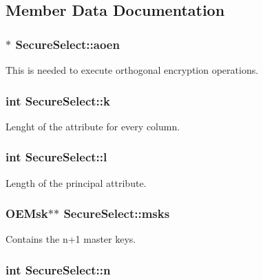 \subsection{Member Data Documentation}
\hypertarget{classSecureSelect_ace499f63f2609b19c429bee5638db42d}{
\subsubsection[{aoen}]{$\ast$ Secure\-Select\-::aoen}}\label{classSecureSelect_ace499f63f2609b19c429bee5638db42d}
This is needed to execute orthogonal encryption operations. \hypertarget{classSecureSelect_aa9172d68f4a5f9aef784703878e2c352}{
\subsubsection[{k}]{\setlength{\rightskip}{0pt plus 5cm}int Secure\-Select\-::k}}\label{classSecureSelect_aa9172d68f4a5f9aef784703878e2c352}
Lenght of the attribute for every column. \hypertarget{classSecureSelect_a010ed62263ff19f8b07dfaa298962f24}{
\subsubsection[{l}]{\setlength{\rightskip}{0pt plus 5cm}int Secure\-Select\-::l}}\label{classSecureSelect_a010ed62263ff19f8b07dfaa298962f24}
Length of the principal attribute. \hypertarget{classSecureSelect_a8f1233a931a2dce84a7f9588721d8301}{
\subsubsection[{msks}]{\setlength{\rightskip}{0pt plus 5cm}O\-E\-Msk$\ast$$\ast$ Secure\-Select\-::msks}}\label{classSecureSelect_a8f1233a931a2dce84a7f9588721d8301}
Contains the n+1 master keys. \hypertarget{classSecureSelect_a0834ef0de36dad948cec8d54fc89aada}{
\subsubsection[{n}]{\setlength{\rightskip}{0pt plus 5cm}int Secure\-Select\-::n}}\label{classSecureSelect_a0834ef0de36dad948cec8d54fc89aada}

